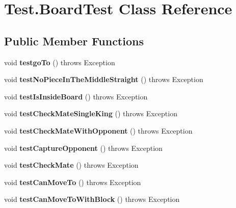 \hypertarget{class_test_1_1_board_test}{}\section{Test.\+Board\+Test Class Reference}
\label{class_test_1_1_board_test}
\subsection*{Public Member Functions}
\begin{DoxyCompactItemize}
\item 
void {\bfseries testgo\+To} ()  throws Exception \hypertarget{class_test_1_1_board_test_ad3cf19d6b94ee85902f7704c05e5294d}{}\label{class_test_1_1_board_test_ad3cf19d6b94ee85902f7704c05e5294d}

\item 
void {\bfseries test\+No\+Piece\+In\+The\+Middle\+Straight} ()  throws Exception \hypertarget{class_test_1_1_board_test_a3eab64f0df28ffebed0c61349263df9d}{}\label{class_test_1_1_board_test_a3eab64f0df28ffebed0c61349263df9d}

\item 
void {\bfseries test\+Is\+Inside\+Board} ()  throws Exception \hypertarget{class_test_1_1_board_test_a6abda7d92957be54facfd5fdc19d6892}{}\label{class_test_1_1_board_test_a6abda7d92957be54facfd5fdc19d6892}

\item 
void {\bfseries test\+Check\+Mate\+Single\+King} ()  throws Exception \hypertarget{class_test_1_1_board_test_a6064fb15fe8ebd54fdd3dc1ac7f68f36}{}\label{class_test_1_1_board_test_a6064fb15fe8ebd54fdd3dc1ac7f68f36}

\item 
void {\bfseries test\+Check\+Mate\+With\+Opponent} ()  throws Exception \hypertarget{class_test_1_1_board_test_a7c25087b76fd393e2e4c59c9916b5f78}{}\label{class_test_1_1_board_test_a7c25087b76fd393e2e4c59c9916b5f78}

\item 
void {\bfseries test\+Capture\+Opponent} ()  throws Exception \hypertarget{class_test_1_1_board_test_af72b8885d1779d91c5934a5d107e2e8d}{}\label{class_test_1_1_board_test_af72b8885d1779d91c5934a5d107e2e8d}

\item 
void {\bfseries test\+Check\+Mate} ()  throws Exception \hypertarget{class_test_1_1_board_test_a215603d80780d0b07b1ad7efdc290503}{}\label{class_test_1_1_board_test_a215603d80780d0b07b1ad7efdc290503}

\item 
void {\bfseries test\+Can\+Move\+To} ()  throws Exception \hypertarget{class_test_1_1_board_test_a1884f81736b1ece2c9b054205ce5b91b}{}\label{class_test_1_1_board_test_a1884f81736b1ece2c9b054205ce5b91b}

\item 
void {\bfseries test\+Can\+Move\+To\+With\+Block} ()  throws Exception \hypertarget{class_test_1_1_board_test_a8b018a6245b67905b815757c0a44d95a}{}\label{class_test_1_1_board_test_a8b018a6245b67905b815757c0a44d95a}

\end{DoxyCompactItemize}


